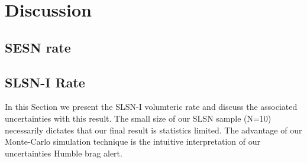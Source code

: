 \documentclass[a4paper,fleqn,usenatbib]{mnras}
\newcommand{\angus}[1]{\color{JungleGreen}#1\color{black}}
\newcommand{\chris}[1]{\color{orange}#1\color{black}}
\begin{document}



\section{Discussion}


\subsection{SESN rate}

\subsection{SLSN-I Rate}



In this Section we present the SLSN-I volumteric rate and discuss the associated uncertainties with this result. The small size of our SLSN sample (N=10) necessarily dictates that our final result is statistics limited. The advantage of our Monte-Carlo simulation technique is the intuitive interpretation of our uncertainties \angus{Humble brag alert}.
\end{document}
